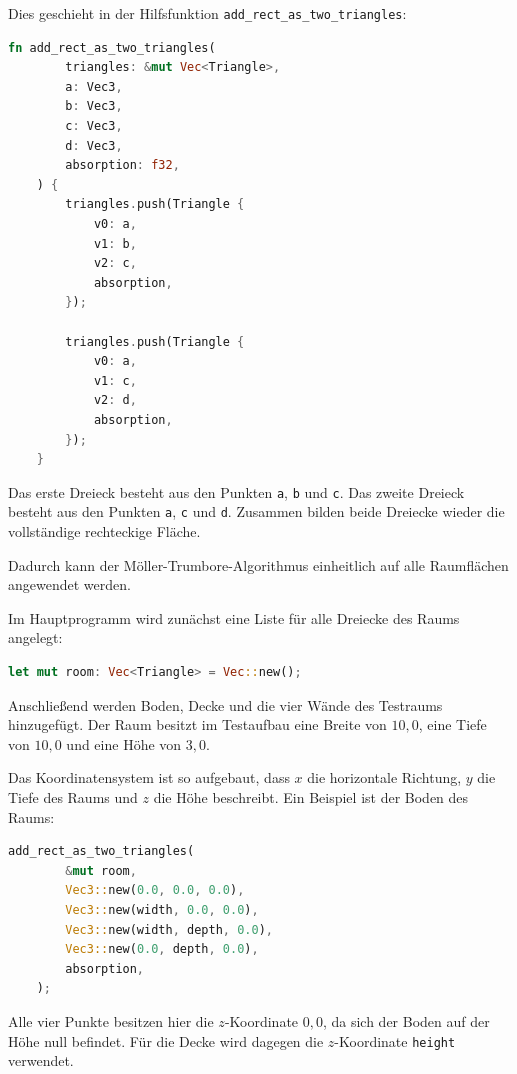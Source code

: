 \documentclass{article}
\begin{document}
    Dies geschieht in der Hilfsfunktion
    \texttt{add\_rect\_as\_two\_triangles}:

    \begin{lstlisting}[language=Rust]
    fn add_rect_as_two_triangles(
        triangles: &mut Vec<Triangle>,
        a: Vec3,
        b: Vec3,
        c: Vec3,
        d: Vec3,
        absorption: f32,
    ) {
        triangles.push(Triangle {
            v0: a,
            v1: b,
            v2: c,
            absorption,
        });

        triangles.push(Triangle {
            v0: a,
            v1: c,
            v2: d,
            absorption,
        });
    }
    \end{lstlisting}

    Das erste Dreieck besteht aus den Punkten \texttt{a}, \texttt{b} und
    \texttt{c}. Das zweite Dreieck besteht aus den Punkten \texttt{a},
    \texttt{c} und \texttt{d}. Zusammen bilden beide Dreiecke wieder die
    vollständige rechteckige Fläche.

    Dadurch kann der Möller-Trumbore-Algorithmus einheitlich auf alle Raumflächen
    angewendet werden.

    Im Hauptprogramm wird zunächst eine Liste für alle Dreiecke des Raums
    angelegt:

    \begin{lstlisting}[language=Rust]
    let mut room: Vec<Triangle> = Vec::new();
    \end{lstlisting}

    Anschließend werden Boden, Decke und die vier Wände des Testraums
    hinzugefügt. Der Raum besitzt im Testaufbau eine Breite von \(10{,}0\), eine
    Tiefe von \(10{,}0\) und eine Höhe von \(3{,}0\).

    Das Koordinatensystem ist so aufgebaut, dass \(x\) die horizontale Richtung,
    \(y\) die Tiefe des Raums und \(z\) die Höhe beschreibt. Ein Beispiel ist der
    Boden des Raums:

    \begin{lstlisting}[language=Rust]
    add_rect_as_two_triangles(
        &mut room,
        Vec3::new(0.0, 0.0, 0.0),
        Vec3::new(width, 0.0, 0.0),
        Vec3::new(width, depth, 0.0),
        Vec3::new(0.0, depth, 0.0),
        absorption,
    );
    \end{lstlisting}

    Alle vier Punkte besitzen hier die \(z\)-Koordinate \(0{,}0\), da sich der
    Boden auf der Höhe null befindet. Für die Decke wird dagegen die
    \(z\)-Koordinate \texttt{height} verwendet.
\end{document}
